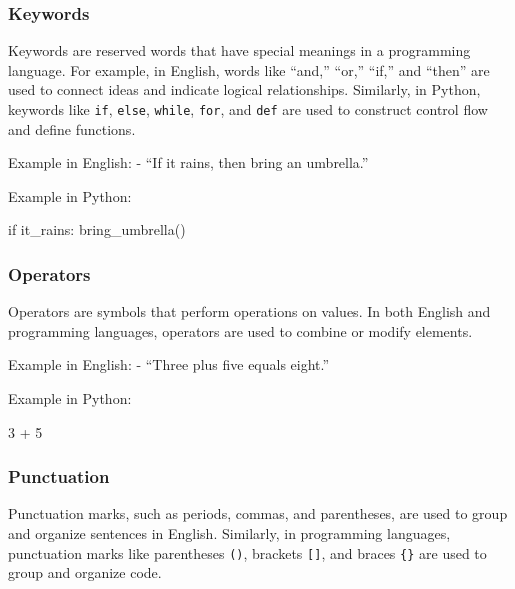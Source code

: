 \documentclass[
  letterpaper,
  DIV=11,
  numbers=noendperiod]{scrreprt}
\newenvironment{Shaded}{\begin{snugshade}}{\end{snugshade}}
\newcommand{\ControlFlowTok}[1]{\textcolor[rgb]{0.00,0.23,0.31}{#1}}
\newcommand{\DecValTok}[1]{\textcolor[rgb]{0.68,0.00,0.00}{#1}}
\newcommand{\NormalTok}[1]{\textcolor[rgb]{0.00,0.23,0.31}{#1}}
\newcommand{\OperatorTok}[1]{\textcolor[rgb]{0.37,0.37,0.37}{#1}}
\begin{document}
\hypertarget{keywords}{%
\subsubsection{Keywords}\label{keywords}}

Keywords are reserved words that have special meanings in a programming
language. For example, in English, words like ``and,'' ``or,'' ``if,''
and ``then'' are used to connect ideas and indicate logical
relationships. Similarly, in Python, keywords like \texttt{if},
\texttt{else}, \texttt{while}, \texttt{for}, and \texttt{def} are used
to construct control flow and define functions.

Example in English: - ``If it rains, then bring an umbrella.''

Example in Python:

\begin{Shaded}
\begin{Highlighting}[]
\ControlFlowTok{if}\NormalTok{ it\_rains:}
\NormalTok{    bring\_umbrella()}
\end{Highlighting}
\end{Shaded}

\hypertarget{operators}{%
\subsubsection{Operators}\label{operators}}

Operators are symbols that perform operations on values. In both English
and programming languages, operators are used to combine or modify
elements.

Example in English: - ``Three plus five equals eight.''

Example in Python:

\begin{Shaded}
\begin{Highlighting}[]
\DecValTok{3} \OperatorTok{+} \DecValTok{5}
\end{Highlighting}
\end{Shaded}

\hypertarget{punctuation}{%
\subsubsection{Punctuation}\label{punctuation}}

Punctuation marks, such as periods, commas, and parentheses, are used to
group and organize sentences in English. Similarly, in programming
languages, punctuation marks like parentheses \texttt{()}, brackets
\texttt{{[}{]}}, and braces \texttt{\{\}} are used to group and organize
code.
\end{document}
